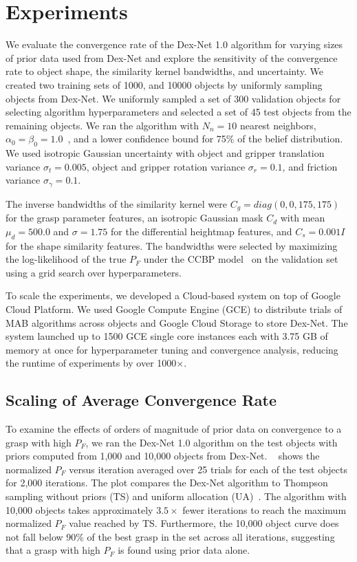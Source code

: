 \section{Experiments}

We evaluate the convergence rate of the Dex-Net 1.0 algorithm for varying sizes of prior data used from Dex-Net and explore the sensitivity of the convergence rate to object shape, the similarity kernel bandwidths, and uncertainty.
We created two training sets of 1000, and 10000 objects by uniformly sampling objects from Dex-Net.
We uniformly sampled a set of 300 validation objects for selecting algorithm hyperparameters and selected a set of 45 test objects from the remaining objects.
We ran the algorithm with $N_n = 10$ nearest neighbors, $\alpha_0 = \beta_0 = 1.0$~\cite{laskey2015bandits}, and a lower confidence bound for 75\% of the belief distribution.
We used isotropic Gaussian uncertainty with object and gripper translation variance $\sigma_{t} = 0.005$, object and gripper rotation variance $\sigma_{r} = 0.1$, and friction variance $\sigma_{\gamma} = 0.1$.

The inverse bandwidths of the similarity kernel were $C_g = diag(0,0,175, 175)$ for the grasp parameter features, an isotropic Gaussian mask $C_d$ with mean $\mu_d = 500.0$ and $\sigma = 1.75$ for the differential heightmap features, and $C_s = 0.001 I$ for the shape similarity features.
The bandwidths were selected by maximizing the log-likelihood of the true $P_F$ under the CCBP model~\cite{goetschalckx2011continuous} on the validation set using a grid search over hyperparameters.

To scale the experiments, we developed a Cloud-based system on top of Google Cloud Platform.
We used Google Compute Engine (GCE) to distribute trials of MAB algorithms across objects and Google Cloud Storage to store Dex-Net.
The system launched up to 1500 GCE single core instances each with 3.75 GB of memory at once for hyperparameter tuning and convergence analysis, reducing the runtime of experiments by over 1000$\times$.

\subsection{Scaling of Average Convergence Rate}
To examine the effects of orders of magnitude of prior data on convergence to a grasp with high $P_F$, we ran the Dex-Net 1.0 algorithm on the test objects with priors computed from 1,000 and 10,000 objects from Dex-Net. 
~ shows the normalized $P_F$ versus iteration averaged over 25 trials for each of the test objects for 2,000 iterations.
The plot compares the Dex-Net algorithm to Thompson sampling without priors (TS) and uniform allocation (UA)~\cite{laskey2015bandits}.
The algorithm with 10,000 objects takes approximately $3.5\times$ fewer iterations to reach the maximum normalized $P_F$ value reached by TS.
Furthermore, the 10,000 object curve does not fall below 90\% of the best grasp in the set across all iterations, suggesting that a grasp with high $P_F$ is found using prior data alone.

